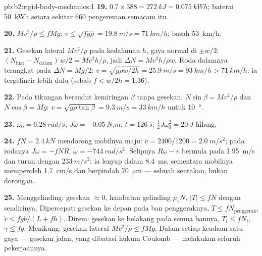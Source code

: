 \begin{solution}{pb:b2:rigid-body-mechanics:1}
\textbf{19.} $0.7 \times 388 = \qty{272}{kJ} = \qty{0.075}{kWh}$; baterai \qty{50}{kWh}
setara sekitar $660$ pengereman semacam itu.

\textbf{20.} $Mv^2/\rho \le fMg$: $v \le \sqrt{fg\rho} = \qty{19.8}{m/s} =
\qty{71}{km/h}$; basah \qty{53}{km/h}.

\textbf{21.} Gesekan lateral $Mv^2/\rho$ pada kedalaman $h$, gaya normal di
$\pm w/2$: $(N_{\text{luar}} - N_{\text{dalam}})\,w/2 = Mv^2h/\rho$, jadi $\Delta N =
Mv^2h/\rho w$. Roda dalamnya terangkat pada $\Delta N = Mg/2$: $v = \sqrt{g\rho w/2h} =
\qty{25.9}{m/s} = \qty{93}{km/h} > \qty{71}{km/h}$: ia tergelincir lebih dulu (sebab $f <
w/2h = 1.36$).

\textbf{22.} Pada tikungan bersudut kemiringan $\beta$ tanpa gesekan, $N\sin\beta =
Mv^2/\rho$ dan $N\cos\beta = Mg$: $v = \sqrt{g\rho\tan\beta} = \qty{9.3}{m/s} =
\qty{33}{km/h}$ untuk \qty{10}{\degree}.

\textbf{23.} $\omega_0 = \qty{6.28}{rad/s}$, $J\dot\omega = \qty{-0.05}{N.m}$: $t =
\qty{126}{s}$; $\tfrac12J\omega_0^2 = \qty{20}{J}$ hilang.

\textbf{24.}  $fN = \qty{2.4}{kN}$ mendorong mobilnya maju:
$\dot v = 2400/1200 = \qty{2.0}{m/s^2}$; pada rodanya $J\dot\omega = -fNR$,
$\dot\omega = \qty{-744}{rad/s^2}$. Selipnya $R\omega - v$ bermula pada \qty{1.95}{m/s}
dan turun dengan $\qty{233}{m/s^2}$: ia lenyap dalam \qty{8.4}{ms}, sementara mobilnya
memperoleh \qty{1.7}{cm/s} dan berpindah \qty{70}{\micro m} --- sebuah sentakan, bukan dorongan.

\textbf{25.} Menggelinding: gesekan $\approx 0$, hambatan gelinding $\mu_rN$,
$|T| \le fN$ dengan sendirinya. Dipercepat: gesekan ke depan pada ban
penggeraknya, $T \le fN_{\text{penggerak}}$, $\dot v \le fgb/(L + fh)$.
Direm: gesekan ke belakang pada semua bannya, $T_i \le fN_i$,
$\gamma \le fg$. Menikung: gesekan lateral $Mv^2/\rho \le fMg$. Dalam
setiap keadaan satu gaya --- gesekan jalan, yang dibatasi hukum
Coulomb --- melakukan seluruh pekerjaannya.
\end{solution}

